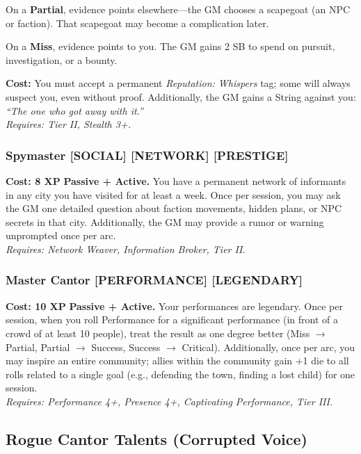 \documentclass[12pt,a4paper]{book}
\begin{document}
On a \textbf{Partial}, evidence points elsewhere---the GM chooses a scapegoat (an NPC or faction). That scapegoat may become a complication later.

On a \textbf{Miss}, evidence points to you. The GM gains 2 SB to spend on pursuit, investigation, or a bounty.

\textbf{Cost:} You must accept a permanent \textit{Reputation: Whispers} tag; some will always suspect you, even without proof. Additionally, the GM gains a String against you: \textit{``The one who got away with it.''} \\
\textit{Requires: Tier II, Stealth 3+.}

\subsubsection*{Spymaster \textnormal{[SOCIAL] [NETWORK] [PRESTIGE]}}
\label{talent:spymaster}
\textbf{Cost: 8 XP} \textbf{Passive + Active.} You have a permanent network of informants in any city you have visited for at least a week. Once per session, you may ask the GM one detailed question about faction movements, hidden plans, or NPC secrets in that city. Additionally, the GM may provide a rumor or warning unprompted once per arc. \\
\textit{Requires: Network Weaver, Information Broker, Tier II.}

\subsubsection*{Master Cantor \textnormal{[PERFORMANCE] [LEGENDARY]}}
\label{talent:master-cantor}
\textbf{Cost: 10 XP} \textbf{Passive + Active.} Your performances are legendary. Once per session, when you roll Performance for a significant performance (in front of a crowd of at least 10 people), treat the result as one degree better (Miss $\rightarrow$ Partial, Partial $\rightarrow$ Success, Success $\rightarrow$ Critical). Additionally, once per arc, you may inspire an entire community; allies within the community gain +1 die to all rolls related to a single goal (e.g., defending the town, finding a lost child) for one session. \\
\textit{Requires: Performance 4+, Presence 4+, Captivating Performance, Tier III.}

\subsection*{Rogue Cantor Talents (Corrupted Voice)}
\label{sec:prestige-rogue-cantor}
\end{document}

